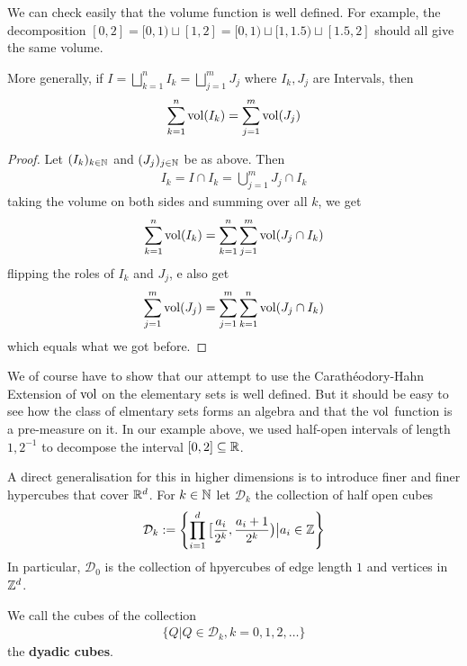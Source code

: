 \begin{rem}[]
  We can check easily that the volume function is well defined.
  For example, the decomposition $[0,2] = [0,1) \sqcup [1,2] = [0,1) \sqcup [1,1.5) \sqcup [1.5,2]$ should all give the same volume.

  More generally, if $I= \bigsqcup_{k=1}^{n}I_k = \bigsqcup_{j=1}^m J_j$ where $I_k,J_j$ are Intervals, then
  \begin{align*}
    \sum_{k=1}^{n}\operatorname{vol}(I_k) = \sum_{j=1}^{m} \operatorname{vol}(J_j)
  \end{align*}
\end{rem}
\begin{proof}
  Let $(I_k)_{k \in \mathbb{N}}$ and $(J_j)_{j \in \mathbb{N}}$ be as above. Then
  \begin{align*}
    I_k = I \cap I_k = \bigcup_{j=1}^{m} J_j \cap I_k
  \end{align*}
  taking the volume on both sides and summing over all $k$, we get
  \begin{align*}
    \sum_{k=1}^{n}\operatorname{vol}(I_k) = \sum_{k=1}^{n} \sum_{j=1}^{m} \operatorname{vol}(J_j \cap I_k)
  \end{align*}
  flipping the roles of $I_k$ and $J_j$, e also get
  \begin{align*}
    \sum_{j=1}^{m} \operatorname{vol}(J_j) = \sum_{j=1}^{m}\sum_{k=1}^{n} \operatorname{vol}(J_j \cap I_k)
  \end{align*}
  which equals what we got before.
\end{proof}
  We of course have to show that our attempt to use the Carathéodory-Hahn Extension of $\operatorname{vol}$ on the elementary sets is well defined. 
  But it should be easy to see how the class of elmentary sets forms an algebra and that the $\operatorname{vol}$ function is a pre-measure on it.
In our example above, we used half-open intervals of length $1, 2^{-1}$ to decompose the interval $[0,2] \subseteq \mathbb{R}$.

A direct generalisation for this in higher dimensions is to introduce finer and finer hypercubes that cover $\mathbb{R}^{d}$.
For $k \in \mathbb{N}$ let $\mathcal{D}_k$ the collection of half open cubes
\begin{align*}
  \mathcal{D}_k := \left\{
  \prod_{i=1}^{d}\big[\frac{a_i}{2^{k}}, \frac{a_{i}+1}{2^{k}}\big) \big\vert a_i \in \mathbb{Z}
  \right\}
\end{align*}  
In particular, $\mathcal{D}_0$ is the collection of hpyercubes of edge length $1$ and vertices in $\mathbb{Z}^d$.

We call the cubes of the collection
\begin{align*}
  \{Q \big\vert Q \in \mathcal{D}_k, k = 0,1,2, \ldots\}
\end{align*}
the \textbf{dyadic cubes}.

